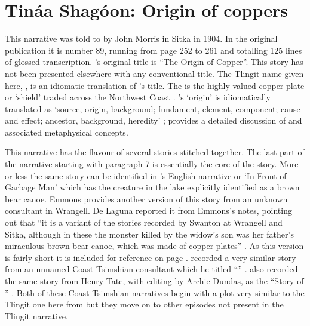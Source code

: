 
\resetexcnt
\chapter{Tináa Shagóon: Origin of coppers}\label{ch:89-origin-of-copper}

This narrative was told to \citeauthor{swanton:1909} by  John Morris in Sitka in 1904.
In the original publication it is number 89, running from page 252 to 261 and totalling 125 lines of glossed transcription.
\citeauthor{swanton:1909}’s original title is “The Origin of Copper”.
This story has not been presented elsewhere with any conventional title.
The Tlingit name given here, , is an idiomatic translation of \citeauthor{swanton:1909}’s title.
The  is the highly valued copper plate or ‘shield’ traded across the Northwest Coast \parencites{keithahn:1964}[353–354]{de-laguna:1972}{jopling:1989}[179–183]{emmons:1991}[237–243]{kan:2016}.
\citeauthor{swanton:1909}’s ‘origin’ is idiomatically translated as  ‘source, origin, background; fundament, element, component; cause and effect; ancestor, background, heredity’ \parencite[\textsc{t}·63]{leer:2001}; \textcite[71 ff.]{kan:2016} provides a detailed discussion of  and associated metaphysical concepts.

This narrative has the flavour of several stories stitched together.
The last part of the narrative starting with paragraph 7 is essentially the core of the  story.
More or less the same story can be identified in ’s English narrative  or  ‘In Front of Garbage Man’ \parencite[132–133]{swanton:1909} which has the creature in the lake explicitly identified as a brown bear canoe.
Emmons provides another version of this story from an unknown consultant in Wrangell. De Laguna reported it from Emmons’s notes, pointing out that “it is a variant of the stories recorded by Swanton at Wrangell and Sitka, although in these the monster killed by the widow’s son was her father’s miraculous brown bear canoe, which was made of copper plates” \parencite[180]{emmons:1991}. As this version is fairly short it is included for reference on page \pageref{sec:89-emmons-version}.
\citeauthor{boas:1895} recorded a very similar story from an unnamed Coast Tsimshian consultant which he titled “” \parencite[581–589]{boas:2002}.
\citeauthor{boas:1912a} also recorded the same story from Henry Tate, with editing by Archie Dundas, as the “Story of ” \parencite[147–191]{boas:1912a}.
Both of these Coast Tsimshian narratives begin with a plot very similar to the Tlingit one here from  but they move on to other episodes not present in the Tlingit narrative.

